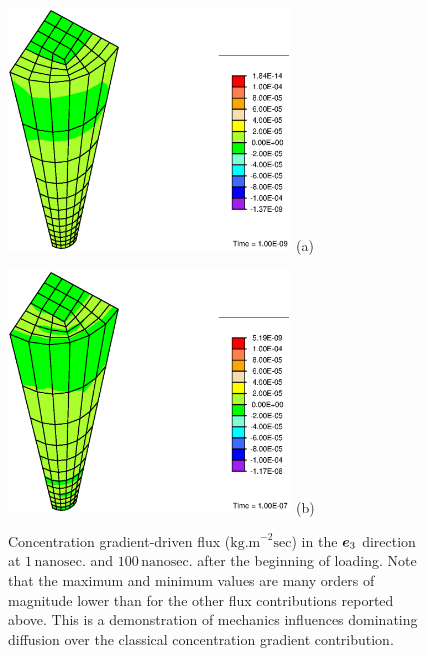 \begin{figure}[ht]
\begin{minipage}[t]{7.5cm}
{\includegraphics[width=7.5cm]{images/M5-1.eps}} \hskip 3cm (a)
\end{minipage}
\begin{minipage}[t]{7.5cm}
{\includegraphics[width=7.5cm]{images/M5-100.eps}} \hskip 3cm (b)
\end{minipage}
\caption{Concentration gradient-driven flux
($\mathrm{kg.m}^{-2}\mathrm{sec}$) in the $\mbox{\boldmath$ e$}_3$ direction at $1
\,\mathrm{nanosec.}$ and $100\,\mathrm{nanosec.}$ after the
beginning of loading. Note that the maximum and minimum values are
many orders of magnitude lower than for the other flux
contributions reported above. This is a demonstration of mechanics
influences dominating diffusion over the classical concentration
gradient contribution.} \label{M5fig}
\end{figure}


